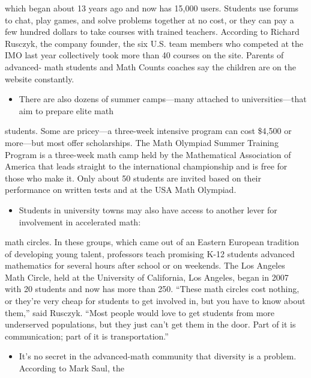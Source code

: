 \documentclass[UTF8,11pt]{ctexart}
\begin{document}
which began about 13 years ago and now has 15,000 users. Students use forums to chat, play games, and solve problems together at no cost, or they can pay a few hundred dollars to take courses with trained teachers. According to Richard Rusczyk, the company founder, the six U.S. team members who competed at the IMO last year collectively took more than 40 courses on the site. Parents of advanced- math students and Math Counts coaches say the children are on the website constantly.


\begin{itemize}[leftmargin=2em,itemsep=.2em,topsep=.4em]\item[H.] There are also dozens of summer camps—many attached to universities—that aim to prepare elite math
\end{itemize}

students. Some are pricey---a three-week intensive program can cost \$4,500 or more—but most offer scholarships. The Math Olympiad Summer Training Program is a three-week math camp held by the Mathematical Association of America that leads straight to the international championship and is free for those who make it. Only about 50 students are invited based on their performance on written tests and at the USA Math Olympiad.


\begin{itemize}[leftmargin=2em,itemsep=.2em,topsep=.4em]\item[I.] Students in university towns may also have access to another lever for involvement in accelerated math:
\end{itemize}

math circles. In these groups, which came out of an Eastern European tradition of developing young talent, professors teach promising K-12 students advanced mathematics for several hours after school or on weekends. The Los Angeles Math Circle, held at the University of California, Los Angeles, began in 2007 with 20 students and now has more than 250. “These math circles cost nothing, or they’re very cheap for students to get involved in, but you have to know about them,” said Rusczyk. “Most people would love to get students from more underserved populations, but they just can’t get them in the door. Part of it is communication; part of it is transportation.”


\begin{itemize}[leftmargin=2em,itemsep=.2em,topsep=.4em]\item[J.] It’s no secret in the advanced-math community that diversity is a problem. According to Mark Saul, the
\end{itemize}
\end{document}
